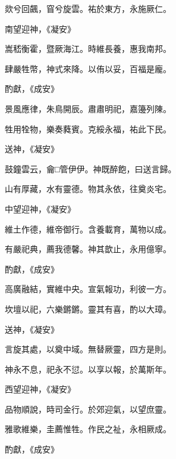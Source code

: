 \begin{pinyinscope}
 欻兮回飆，窅兮旋雲。祐於東方，永施厥仁。



 南望迎神，《凝安》



 嵩嵇衡霍，暨厥海江。時維長養，惠我南邦。



 肆嚴牲幣，神式來降。以侑以妥，百福是龐。



 酌獻，《成安》



 景風應律，朱鳥開辰。肅肅明祀，嘉籩列陳。



 牲用牷物，樂奏蕤賓。克綏永福，祐此下民。



 送神，《凝安》



 鼓鐘雲云，龠□管伊伊。神既醉飽，曰送言歸。



 山有厚藏，水有靈德。物其永依，往奠炎宅。



 中望迎神，《凝安》



 維土作德，維帝御行。含養載育，萬物以成。



 有嚴祀典，薦我德馨。神其歆止，永用億寧。



 酌獻，《成安》



 高廣融結，實維中央。宣氣報功，利彼一方。



 坎壇以祀，六樂鏘鏘。靈其有喜，酌以大璋。



 送神，《凝安》



 言旋其處，以奠中域。無替厥靈，四方是則。



 神永不息，祀永不愆。以享以報，於萬斯年。



 西望迎神，《凝安》



 品物順說，時司金行。於郊迎氣，以望庶靈。



 雅歌維樂，圭薦惟牲。作民之祉，永相厥成。



 酌獻，《成安》




\end{pinyinscope}
